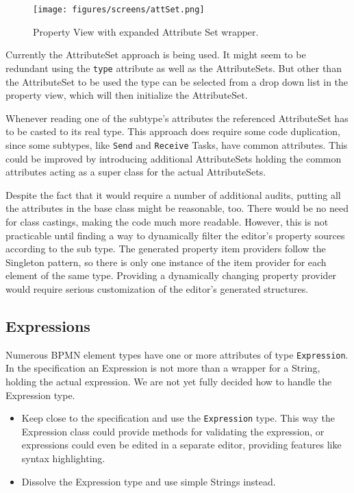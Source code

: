 \begin{figure}[ht]
	\centering
	\texttt{[image: figures/screens/attSet.png]}
	\caption[Attribute Set in Eclipse Property View]{Property View with expanded Attribute Set wrapper.}
	\label{fig:attSet}
\end{figure}

Currently the AttributeSet approach is being used. It might seem to be redundant using the \verb|type| attribute as well as the AttributeSets. But other than the AttributeSet to be used the type can be selected from a drop down list in the property view, which will then initialize the AttributeSet.

Whenever reading one of the subtype's attributes the referenced AttributeSet has to be casted to its real type. This approach does require some code duplication, since some subtypes, like \verb|Send| and \verb|Receive| Tasks, have common attributes. This could be improved by introducing additional AttributeSets holding the common attributes acting as a super class for the actual AttributeSets.

Despite the fact that it would require a number of additional audits, putting all the attributes in the base class might be reasonable, too. There would be no need for class castings, making the code much more readable. However, this is not practicable until finding a way to dynamically filter the editor's property sources according to the sub type. The generated property item providers follow the Singleton pattern, so there is only one instance of the item provider for each element of the same type. Providing a dynamically changing property provider would require serious customization of the editor's generated structures.


\subsection{Expressions}

Numerous BPMN element types have one or more attributes of type \verb|Expression|. In the specification an Expression is not more than a wrapper for a String, holding the actual expression. We are not yet fully decided how to handle the Expression type.

\begin{itemize}
        \item Keep close to the specification and use the \verb|Expression| type. This way the Expression class could provide methods for validating the expression, or expressions could even be edited in a separate editor, providing features like syntax highlighting. 
        \item Dissolve the Expression type and use simple Strings instead.
\end{itemize}

